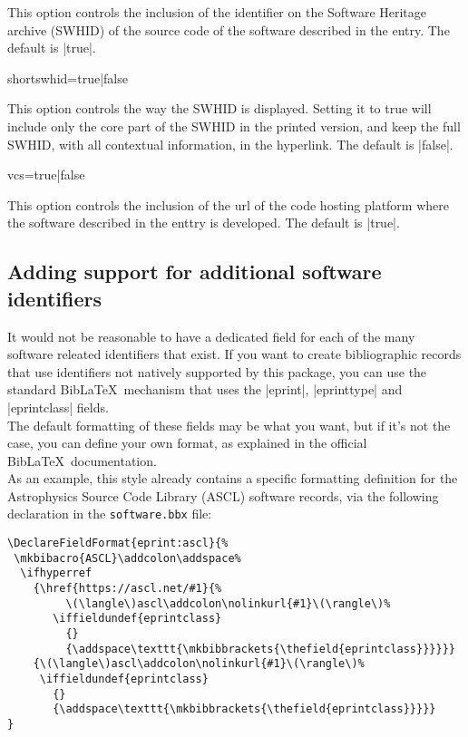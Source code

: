 \documentclass{ltxdockit}
\begin{document}
\noindent This option controls the inclusion of the identifier on the Software Heritage archive
(SWHID) of the source code of the software described in the entry. The default is |true|.

\begin{ltxcode}
  shortswhid=true|false
\end{ltxcode}

\noindent This option controls the way the SWHID is displayed. Setting it to true will include
only the core part of the SWHID in the printed version, and keep the full SWHID, with all contextual
information, in the hyperlink. The default is |false|.

\begin{ltxcode}
  vcs=true|false
\end{ltxcode}

\noindent This option controls the inclusion of the url of the code hosting
platform where the software described in the enttry is developed. The default is |true|.

\subsection{Adding support for additional software identifiers}

It would not be reasonable to have a dedicated field for each of the many software releated identifiers that exist.
If you want to create bibliographic records that use identifiers not natively supported by this package, you
can use the standard Bib\LaTeX\ mechanism that uses the |eprint|, |eprinttype| and |eprintclass| fields.\\

The default formatting of these fields may be what you want, but if it's not the case, you can define
your own format, as explained in the official Bib\LaTeX\ documentation.\\

As an example, this style already contains a specific formatting definition for the Astrophysics Source Code Library (ASCL) software records,
via the following declaration in the \verb|software.bbx| file:

\begin{verbatim}
\DeclareFieldFormat{eprint:ascl}{%
 \mkbibacro{ASCL}\addcolon\addspace%
  \ifhyperref
    {\href{https://ascl.net/#1}{%
         \(\langle\)ascl\addcolon\nolinkurl{#1}\(\rangle\)%
       \iffieldundef{eprintclass}
         {}
         {\addspace\texttt{\mkbibbrackets{\thefield{eprintclass}}}}}}
    {\(\langle\)ascl\addcolon\nolinkurl{#1}\(\rangle\)%
     \iffieldundef{eprintclass}
       {}
       {\addspace\texttt{\mkbibbrackets{\thefield{eprintclass}}}}}
}
\end{verbatim}
\end{document}
